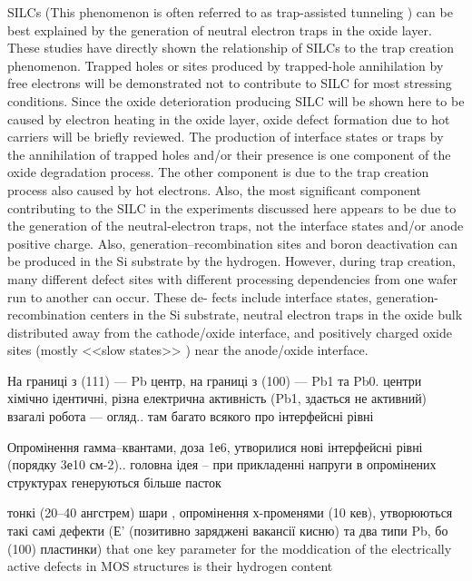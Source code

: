 \documentclass[a4paper,14pt,oneside,openany]{memoir}
\begin{document}
SILCs  (This  phenomenon  is  often  referred  to  as  trap-assisted  tunneling ) can  be  best  explained  by  the generation  of  neutral  electron  traps  in  the  oxide  layer.
These  studies  have  directly  shown  the  relationship  of SILCs  to  the  trap  creation  phenomenon.
Trapped  holes  or  sites  produced by  trapped-hole  annihilation  by  free  electrons  will  be demonstrated  not  to  contribute  to  SILC  for  most  stressing conditions.
Since  the  oxide  deterioration  producing  SILC  will  be shown  here  to  be  caused  by  electron  heating  in  the  oxide layer,
oxide  defect  formation  due  to  hot  carriers  will  be briefly  reviewed.
The  production  of  interface  states or  traps by  the  annihilation  of  trapped  holes  and/or  their  presence  is
one  component  of  the  oxide  degradation  process.
The other  component  is  due  to  the  trap  creation  process  also  caused by  hot  electrons.
  Also, the  most  significant  component  contributing  to  the  SILC  in the  experiments  discussed here  appears to  be due  to  the  generation  of  the  neutral-electron  traps,  not  the  interface  states and/or  anode positive  charge.
Also,  generation--recombination  sites  and boron  deactivation  can be produced  in  the Si  substrate by  the hydrogen.
However,  during  trap  creation,  many  different  defect  sites  with  different  processing  dependencies  from  one wafer  run  to  another  can  occur.  These  de-
fects  include  interface  states, generation-recombination  centers  in  the  Si  substrate,  neutral  electron  traps  in  the  oxide  bulk  distributed  away  from  the  cathode/oxide  interface,  and positively  charged  oxide  sites  (mostly  <<slow  states>> )  near the  anode/oxide  interface.\cite{SiO2:DiMaria}

На границі з (111) --- Pb центр,
на границі з (100) --- Pb1 та Pb0.
центри хімічно ідентичні, різна електрична активність (Pb1, здається не активний)
взагалі робота --- огляд.. там багато всякого про інтерфейсні рівні \cite{SiO2:Rev}

Опромінення гамма--квантами, доза 1е6,
утворилися нові інтерфейсні рівні (порядку 3е10 см-2).. головна ідея -- при прикладенні напруги в опромінених структурах генеруються більше пасток \cite{AASSIME1997}

тонкі (20--40 ангстрем) шари , опромінення х-променями (10 кев), утворюються такі самі дефекти (Е' (позитивно заряджені вакансії кисню) та два типи Pb, бо (100) пластинки)
that one key parameter for the moddication of the electrically  active  defects  in  MOS  structures  is their hydrogen content \cite{SiO2:Cantin}
\end{document}
